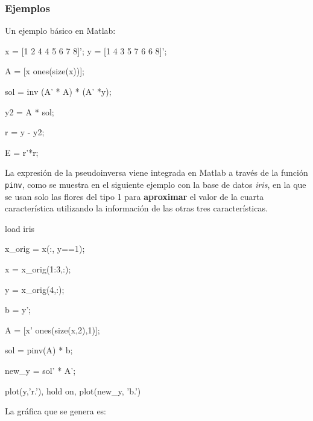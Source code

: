 \documentclass[11pt]{scrartcl}
\begin{document}
\subsubsection{Ejemplos}

Un ejemplo básico en Matlab:

\begin{matlabcode}
x = [1 2 4 4 5 6 7 8]';
y = [1 4 3 5 7 6 6 8]';

A = [x ones(size(x))];

sol = inv (A' * A) * (A' *y);

y2 = A * sol;

r = y - y2;

E = r'*r;
\end{matlabcode}

La expresión de la pseudoinversa viene integrada en Matlab a través de la
función \texttt{pinv}, como se muestra en el siguiente ejemplo con la base de
datos \textit{iris}, en la que se usan solo las flores del tipo 1 para
\textbf{aproximar} el valor de la cuarta característica utilizando la
información de las otras tres características.

\begin{matlabcode}
load iris

x_orig = x(:, y==1);

x = x_orig(1:3,:);

y = x_orig(4,:);

b = y';

A = [x' ones(size(x,2),1)];

sol = pinv(A) * b;

new_y = sol' * A';

plot(y,'r.'), hold on, plot(new_y, 'b.')  
\end{matlabcode}

La gráfica que se genera es:
\end{document}
